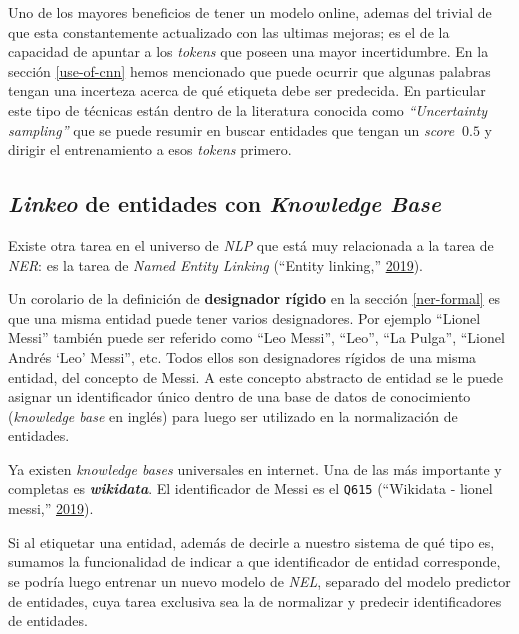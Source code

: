 \documentclass[12pt,a4paper,]{scrartcl}
\begin{document}
Uno de los mayores beneficios de tener un modelo online, ademas del trivial de que esta constantemente actualizado con las ultimas mejoras; es el de la capacidad de apuntar a los \emph{tokens} que poseen una mayor incertidumbre. En la sección \ref{use-of-cnn} hemos mencionado que puede ocurrir que algunas palabras tengan una incerteza acerca de qué etiqueta debe ser predecida. En particular este tipo de técnicas están dentro de la literatura conocida como \emph{\enquote{Uncertainty sampling}} que se puede resumir en buscar entidades que tengan un \emph{score} \(~ 0.5\) y dirigir el entrenamiento a esos \emph{tokens} primero.

\hypertarget{linkeo-de-entidades-con-knowledge-base}{%
\subsection{\texorpdfstring{\emph{Linkeo} de entidades con \emph{Knowledge Base}}{Linkeo de entidades con Knowledge Base}}\label{linkeo-de-entidades-con-knowledge-base}}

Existe otra tarea en el universo de \emph{NLP} que está muy relacionada a la tarea de \emph{NER}: es la tarea de \emph{Named Entity Linking} (``Entity linking,'' \protect\hyperlink{ref-wiki_nel}{2019}).

Un corolario de la definición de \textbf{designador rígido} en la sección \ref{ner-formal} es que una misma entidad puede tener varios designadores. Por ejemplo \enquote{Lionel Messi} también puede ser referido como \enquote{Leo Messi}, \enquote{Leo}, \enquote{La Pulga}, \enquote{Lionel Andrés \enquote{Leo} Messi}, etc. Todos ellos son designadores rígidos de una misma entidad, del concepto de Messi. A este concepto abstracto de entidad se le puede asignar un identificador único dentro de una base de datos de conocimiento (\emph{knowledge base} en inglés) para luego ser utilizado en la normalización de entidades.

Ya existen \emph{knowledge bases} universales en internet. Una de las más importante y completas es \textbf{\emph{wikidata}}. El identificador de Messi es el \texttt{Q615} (``Wikidata - lionel messi,'' \protect\hyperlink{ref-wikidata_messi}{2019}).

Si al etiquetar una entidad, además de decirle a nuestro sistema de qué tipo es, sumamos la funcionalidad de indicar a que identificador de entidad corresponde, se podría luego entrenar un nuevo modelo de \emph{NEL}, separado del modelo predictor de entidades, cuya tarea exclusiva sea la de normalizar y predecir identificadores de entidades.
\end{document}
